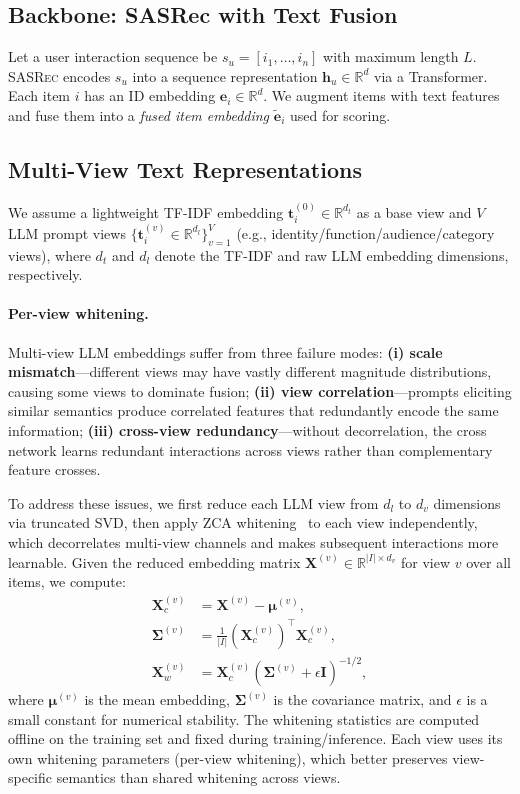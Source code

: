 \documentclass[sigconf,natbib=true,anonymous]{acmart}
\newcommand{\base}{\textsc{SASRec}\xspace}
\newcommand{\tfidf}{\textsc{TF-IDF}\xspace}
\newcommand{\llm}{\textsc{LLM}\xspace}
\newcommand{\slashbreak}{/\allowbreak{}}
\begin{document}
\subsection{Backbone: SASRec with Text Fusion}
Let a user interaction sequence be $s_u = [i_1,\dots,i_n]$
with maximum length $L$. \base encodes $s_u$ into a sequence
representation $\mathbf{h}_u \in \mathbb{R}^d$ via a
Transformer. Each item $i$ has an ID embedding
$\mathbf{e}_i \in \mathbb{R}^d$. We augment items with text
features and fuse them into a \emph{fused item embedding}
$\tilde{\mathbf{e}}_i$ used for scoring.

\subsection{Multi-View Text Representations}\label{sec:whiten}
We assume a lightweight \tfidf embedding $\mathbf{t}_i^{(0)} \in \mathbb{R}^{d_t}$
as a base view and $V$ \llm prompt views
$\{\mathbf{t}_i^{(v)} \in \mathbb{R}^{d_l}\}_{v=1}^V$ (e.g.,
identity\slashbreak{}function\slashbreak{}audience\slashbreak{}category views), where $d_t$ and $d_l$ denote the
\tfidf and raw \llm embedding dimensions, respectively.

\paragraph{Per-view whitening.}
Multi-view \llm embeddings suffer from three failure modes:
\textbf{(i) scale mismatch}---different views may have vastly
different magnitude distributions, causing some views to
dominate fusion; \textbf{(ii) view correlation}---prompts
eliciting similar semantics produce correlated features that
redundantly encode the same information; \textbf{(iii)
cross-view redundancy}---without decorrelation, the cross
network learns redundant interactions across views rather than
complementary feature crosses.

To address these issues, we first reduce each \llm view from $d_l$ to $d_v$
dimensions via truncated SVD, then apply ZCA whitening~\cite{kessy2018zca} to each view
independently, which decorrelates multi-view channels and makes
subsequent interactions more learnable.
Given the reduced embedding matrix $\mathbf{X}^{(v)} \in \mathbb{R}^{|I| \times d_v}$
for view $v$ over all items, we compute:
\begin{align}
  \mathbf{X}_c^{(v)} &= \mathbf{X}^{(v)} - \boldsymbol{\mu}^{(v)}, \\
  \boldsymbol{\Sigma}^{(v)} &= \frac{1}{|I|}(\mathbf{X}_c^{(v)})^\top \mathbf{X}_c^{(v)}, \\
  \mathbf{X}_w^{(v)} &= \mathbf{X}_c^{(v)} (\boldsymbol{\Sigma}^{(v)} + \epsilon \mathbf{I})^{-1/2},
\end{align}
where $\boldsymbol{\mu}^{(v)}$ is the mean embedding, $\boldsymbol{\Sigma}^{(v)}$
is the covariance matrix, and $\epsilon$ is a small constant for numerical
stability. The whitening statistics are computed offline on the training set
and fixed during training\slashbreak{}inference. Each view uses its own whitening
parameters (per-view whitening), which better preserves view-specific
semantics than shared whitening across views.
\end{document}
